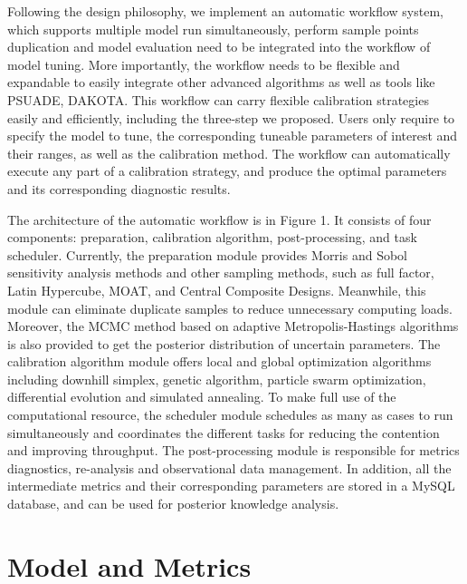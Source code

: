 \documentclass[gmd, manuscript]{copernicus}
\begin{document}
Following the design philosophy, we implement an automatic workflow system, which supports multiple model run simultaneously, perform sample points duplication and model evaluation need to be integrated into the workflow of model tuning. More importantly, the workflow needs to be flexible and expandable to easily integrate other advanced algorithms as well as tools like PSUADE, DAKOTA. This workflow can carry flexible calibration strategies easily and efficiently, including the three-step we proposed. Users only require to specify the model to tune, the corresponding tuneable parameters of interest and their ranges, as well as the calibration method. The workflow can automatically execute any part of a calibration strategy, and produce the optimal parameters and its corresponding diagnostic results.


The architecture of the automatic workflow is in Figure 1. It consists of four components: preparation, calibration algorithm, post-processing, and task scheduler. Currently, the preparation module provides Morris and Sobol sensitivity analysis methods and other sampling methods, such as full factor, Latin Hypercube, MOAT, and Central Composite Designs. Meanwhile, this module can eliminate duplicate samples to reduce unnecessary computing loads. Moreover, the MCMC method based on adaptive Metropolis-Hastings algorithms is also provided to get the posterior distribution of uncertain parameters. The calibration algorithm module offers local and global optimization algorithms including downhill simplex, genetic algorithm, particle swarm optimization, differential evolution and simulated annealing. To make full use of the computational resource, the scheduler module schedules as many as cases to run simultaneously and coordinates the different tasks for reducing the contention and improving throughput. The post-processing module is responsible for metrics diagnostics, re-analysis and observational data management. In addition, all the intermediate metrics and their corresponding parameters are stored in a MySQL database, and can be used for posterior knowledge analysis.


\section{Model and Metrics}
\end{document}
